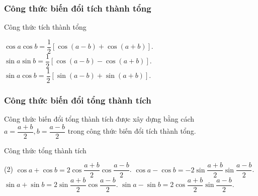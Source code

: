 \begin{tomtat}
	\subsubsection{Công thức biến đổi tích thành tổng}
	\begin{khung4}{Công thức tích thành tổng}
		\begin{tasks}[style=itemize]
			\task $\cos a \cos b = \dfrac{1}{2}\left[\cos (a-b) + \cos (a+b)\right]$.
		\task $\sin a \sin b = \dfrac{1}{2}\left[\cos (a-b)-\cos(a+b)\right]$.
		\task $\sin a \cos b = \dfrac{1}{2}\left[\sin (a-b)+\sin (a+b)\right]$.
		\end{tasks}
		\end{khung4}
	\subsubsection{Công thức biến đổi tổng thành tích}
	Công thức biến đổi tổng thành tích được xây dựng bằng cách $a=\dfrac{a+b}{2}, b = \dfrac{a-b}{2}$ trong công thức biến đổi tích thành tổng.
	\begin{khung4}{Công thức tổng thành tích}
		\begin{tasks}[style=itemize](2)
			\task $\cos a+ \cos b = 2\cos\dfrac{a+b}{2}\cos \dfrac{a-b}{2}$.
		\task $\cos a- \cos b = -2\sin\dfrac{a+b}{2}\sin \dfrac{a-b}{2}$.
		\task $\sin a+ \sin b = 2\sin\dfrac{a+b}{2}\cos \dfrac{a-b}{2}$.
		\task $\sin a -\sin b = 2\cos\dfrac{a+b}{2}\sin \dfrac{a-b}{2}$.
		\end{tasks}
		\end{khung4}
\end{tomtat}

